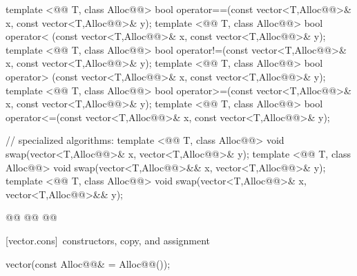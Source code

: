 \documentclass[american,twoside]{book}
\begin{document}
\begin{codeblock}
{  template <@@ T, class Alloc@@>
    bool operator==(const vector<T,Alloc@@>& x, const vector<T,Alloc@@>& y);
  template <@@ T, class Alloc@@>
    bool operator< (const vector<T,Alloc@@>& x, const vector<T,Alloc@@>& y);
  template <@@ T, class Alloc@@>
    bool operator!=(const vector<T,Alloc@@>& x, const vector<T,Alloc@@>& y);
  template <@@ T, class Alloc@@>
    bool operator> (const vector<T,Alloc@@>& x, const vector<T,Alloc@@>& y);
  template <@@ T, class Alloc@@>
    bool operator>=(const vector<T,Alloc@@>& x, const vector<T,Alloc@@>& y);
  template <@@ T, class Alloc@@>
    bool operator<=(const vector<T,Alloc@@>& x, const vector<T,Alloc@@>& y);

  // specialized algorithms:
  template <@@ T, class Alloc@@>
    void swap(vector<T,Alloc@@>& x, vector<T,Alloc@@>& y);
  template <@@ T, class Alloc@@>
    void swap(vector<T,Alloc@@>&& x, vector<T,Alloc@@>& y);
  template <@@ T, class Alloc@@>
    void swap(vector<T,Alloc@@>& x, vector<T,Alloc@@>&& y);

  @@
    @@
      @@
}
\end{codeblock}%
%

[vector.cons]{\ constructors, copy, and assignment}

\begin{itemdecl}
vector(const Alloc@@& = Alloc@@());
\end{itemdecl}
\end{document}
